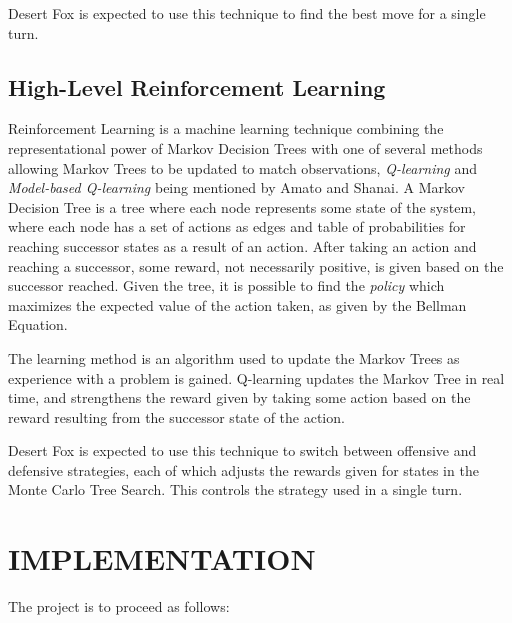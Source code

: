 \documentclass[twocolumn]{article}
\begin{document}
Desert Fox is expected to use this technique to find the best move for a single turn.


\subsection{High-Level Reinforcement Learning \cite{amato10}}

Reinforcement Learning is a machine learning technique combining the representational power of Markov Decision Trees with one of several methods allowing Markov Trees to be updated to match observations, {\it Q-learning} and {\it Model-based Q-learning} being mentioned by Amato and Shanai.
A Markov Decision Tree is a tree where each node represents some state of the system, where each node has a set of actions as edges and table of probabilities for reaching successor states as a result of an action.
After taking an action and reaching a successor, some reward, not necessarily positive, is given based on the successor reached.
Given the tree, it is possible to find the {\it policy} which maximizes the expected value of the action taken, as given by the Bellman Equation.

The learning method is an algorithm used to update the Markov Trees as experience with a problem is gained. Q-learning updates the Markov Tree in real time, and strengthens the reward given by taking some action based on the reward resulting from the successor state of the action.

Desert Fox is expected to use this technique to switch between offensive and defensive strategies, each of which adjusts the rewards given for states in the Monte Carlo Tree Search. This controls the strategy used in a single turn.

\section{IMPLEMENTATION}

The project is to proceed as follows:
\end{document}
